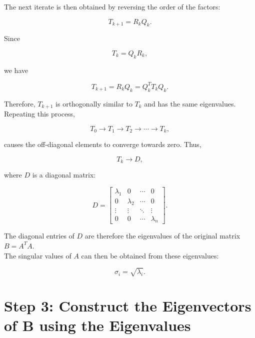\documentclass{article}
\begin{document}
The next iterate is then obtained by reversing the order of the
factors:

\[
    T_{k+1} = R_k Q_k.
\]

Since

\[
    T_k = Q_k R_k,
\]

we have

\[
    T_{k+1}
    = R_k Q_k
    = Q_k^T T_k Q_k.
\]

Therefore, $T_{k+1}$ is orthogonally similar to $T_k$ and has
the same eigenvalues.\\

Repeating this process,

\[
    T_0 \rightarrow T_1 \rightarrow T_2
    \rightarrow \cdots \rightarrow T_k,
\]

causes the off-diagonal elements to converge towards zero. Thus,

\[
    T_k \rightarrow D,
\]

where $D$ is a diagonal matrix:

\[
    D =
    \begin{bmatrix}
        \lambda_1 & 0         & \cdots & 0         \\
        0         & \lambda_2 & \cdots & 0         \\
        \vdots    & \vdots    & \ddots & \vdots    \\
        0         & 0         & \cdots & \lambda_n
    \end{bmatrix}.
\]

The diagonal entries of $D$ are therefore the eigenvalues of
the original matrix $B = A^T A$.\\

The singular values of $A$ can then be obtained from these
eigenvalues:

\[
    \sigma_i = \sqrt{\lambda_i}.
\]

\section{Step 3: Construct the Eigenvectors of B using the Eigenvalues}
\end{document}
